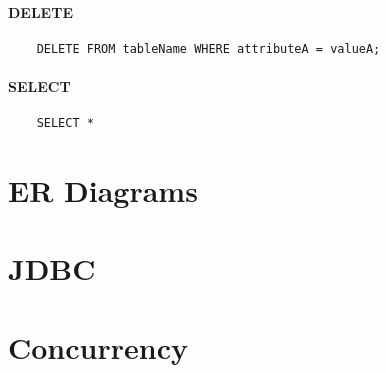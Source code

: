 \paragraph{DELETE}
\begin{verbatim}
	DELETE FROM tableName WHERE attributeA = valueA;
\end{verbatim}

\paragraph{SELECT}
\begin{verbatim}
	SELECT *
\end{verbatim}
\section{ER Diagrams}
\section{JDBC}
\section{Concurrency}